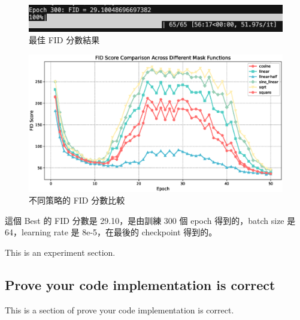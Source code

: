 \begin{figure}[h]
    \centering
    \includegraphics[width=\textwidth]{figures/best_fid_score.png}
    \caption{最佳 FID 分數結果}
    \label{fig:best_fid_score}
\end{figure}


\begin{figure}[h]
    \centering
    \includegraphics[width=\textwidth]{figures/fid_comparison.eps}
    \caption{不同策略的 FID 分數比較}
    \label{fig:fid_comparison}
\end{figure}






這個 Best 的 FID 分數是 29.10，是由訓練 300 個 epoch 得到的，batch size 是 64，learning rate 是 8e-5，在最後的 checkpoint 得到的。

This is an experiment section. 

\subsection{Prove your code implementation is correct}
This is a section of prove your code implementation is correct.

